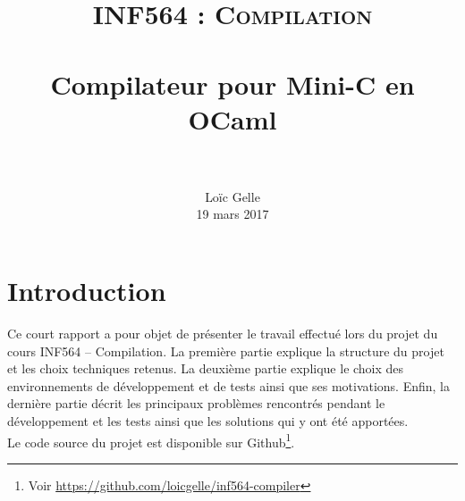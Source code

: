 \documentclass[paper=a4, fontsize=11pt]{scrartcl}
\title{	
		\usefont{OT1}{bch}{b}{n}
		\normalfont \normalsize \textsc{INF564 : Compilation} \\ [25pt]
		\horrule{0.5pt} \\[0.4cm]
		\huge Compilateur pour Mini-C en OCaml \\
		\horrule{2pt} \\[0.5cm]
}
\author{
		\normalfont 								\normalsize
        Lo\"{i}c Gelle\\[-3pt]		\normalsize
        19 mars 2017
}
\date{}
\numberwithin{figure}{section}			%
\numberwithin{table}{section}				%
\begin{document}
\maketitle
\section{Introduction}

Ce court rapport a pour objet de présenter le travail effectué lors du projet du cours INF564 -- Compilation. La première partie explique la structure du projet et les choix techniques retenus. La deuxième partie explique le choix des environnements de développement et de tests ainsi que ses motivations. Enfin, la dernière partie décrit les principaux problèmes rencontrés pendant le développement et les tests ainsi que les solutions qui y ont été apportées. \\

Le code source du projet est disponible sur Github\footnote{Voir \url{https://github.com/loicgelle/inf564-compiler}}.
\end{document}

